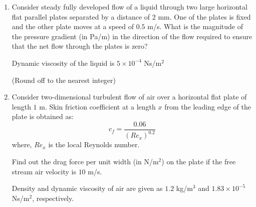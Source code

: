 \documentclass[journal]{IEEEtran}
\numberwithin{equation}{enumi}
\numberwithin{figure}{enumi}
\begin{document}
\begin{enumerate}
\begin{enumerate}
        \item 
{}
    \end{enumerate}

\item Consider steady fully developed flow of a liquid through two large horizontal flat parallel plates separated by a distance of $2$ mm. One of the plates is fixed and the other plate moves at a speed of $0.5$ m/s. What is the magnitude of the pressure gradient (in Pa/m) in the direction of the flow required to ensure that the net flow through the plates is zero?

Dynamic viscosity of the liquid is $5 \times 10^{-4}$ Ns/m$^2$

(Round off to the nearest integer)
\bigskip

\item Consider two-dimensional turbulent flow of air over a horizontal flat plate of length $1$ m. Skin friction coefficient at a length $x$ from the leading edge of the plate is obtained as:
\[
c_f = \frac{0.06}{\left( Re_x \right)^{0.2}}
\]
where, $Re_x$ is the local Reynolds number.

Find out the drag force per unit width (in N/m$^2$) on the plate if the free stream air velocity is $10$ m/s.

Density and dynamic viscosity of air are given as $1.2$ kg/m$^3$ and $1.83 \times 10^{-5}$ Ns/m$^2$, respectively.


\end{enumerate}
\end{document}
